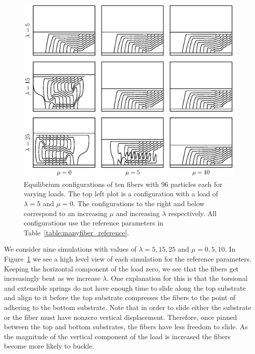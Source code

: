 	\begin{figure}
		\begin{center}
			\includegraphics[scale=1]{./fig/ch4/grid.eps}
		\end{center}		
		\caption{Equilibrium configurations of ten fibers with 96 particles each for varying loads. The top left plot is a configuration with a load of $\lambda = 5$ and $\mu = 0$. The configurations to the right and below correspond to an increasing $\mu$ and increasing $\lambda$ respectively. All configurations use the reference parameters in Table~\ref{table:manyfiber_reference}.
		\label{fig:grid}}
	\end{figure}
	
	We consider nine simulations with values of $\lambda = 5, 15, 25$ and $\mu = 0, 5, 10$. In Figure~\ref{fig:grid} we see a high level view of each simulation for the reference parameters. Keeping the horizontal component of the load zero, we see that the fibers get increasingly bent as we increase $\lambda$. One explanation for this is that the torsional and extensible springs do not have enough time to slide along the top substrate and align to it before the top substrate compresses the fibers to the point of adhering to the bottom substrate. Note that in order to slide either the substrate or the fiber must have nonzero vertical displacement. Therefore, once pinned between the top and bottom substrates, the fibers have less freedom to slide. As the magnitude of the vertical component of the load is increased the fibers become more likely to buckle. 
	

